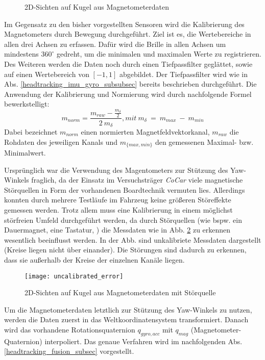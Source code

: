 \begin{figure}[ht]
\centering
{}

\caption[]{2D-Sichten auf Kugel aus Magnetometerdaten}
\label{fig:mag_kugel_plots}
\end{figure}

Im Gegensatz zu den bisher vorgestellten Sensoren wird die Kalibrierung des Magnetometers durch Bewegung durchgeführt.
Ziel ist es, die Wertebereiche in allen drei Achsen zu erfassen.
Dafür wird die Brille in allen Achsen um mindestens $360^\circ$ gedreht, um die minimalen und maximalen Werte zu registrieren. 
Des Weiteren werden die Daten noch durch einen Tiefpassfilter geglättet, sowie auf einen Wertebereich von $[-1,1]$ abgebildet.
Der Tiefpassfilter wird wie in Abs. \ref{headtracking_imu_gyro_subsubsec} bereits beschrieben durchgeführt. 
Die Anwendung der Kalibrierung und Normierung wird durch nachfolgende Formel bewerkstelligt:
\begin{equation}
    m_{norm} = \frac{m_{raw}- \frac{m_{\delta}}{2}}{2~m_{\delta}}, {\scriptstyle mit~m_{\delta}~=~m_{max}~-~m_{min}}
\end{equation}
Dabei bezeichnet $m_{norm}$ einen normierten Magnetfeldvektorkanal, $m_{raw}$ die Rohdaten des jeweiligen Kanals und $m_{\lbrace max, min\rbrace}$ den gemessenen Maximal- bzw. Minimalwert.

Ursprünglich war die Verwendung des Magentometers zur Stützung des Yaw-Winkels fraglich, da der Einsatz im Versuchsträger \emph{CoCar} viele magnetische Störquellen in Form der vorhandenen Boardtechnik vermuten lies. 
Allerdings konnten durch mehrere Testläufe im Fahrzeug keine größeren Störeffekte gemessen werden. Trotz allem muss eine Kalibrierung in einem möglichst störfreien Umfeld durchgeführt werden, da durch Störquellen (wie bspw. ein Dauermagnet, eine Tastatur, \oae) die Messdaten wie in Abb. \ref{fig:uncalibrated_error} zu erkennen wesentlich beeinflusst werden. In der Abb. sind unkalibriete Messdaten dargestellt (Kreise liegen nicht über einander). Die Störungen sind dadurch zu erkennen, dass sie außerhalb der Kreise der einzelnen Kanäle liegen.

\begin{figure}[ht]
	\centering
    \texttt{[image: uncalibrated\_error]}
	\caption[]{2D-Sichten auf Kugel aus Magnetometerdaten mit Störquelle}
	\label{fig:uncalibrated_error}
\end{figure}

Um die Magnetometerdaten letztlich zur Stützung des Yaw-Winkels zu nutzen, werden die Daten zuerst in das Weltkoordinatensystem transformiert.
Danach wird das vorhandene Rotationsquaternion $q_{gyro,acc}$ mit $q_{mag}$ (Magnetometer-Quaternion) interpoliert.
Das genaue Verfahren wird im nachfolgenden Abs. \ref{headtracking_fusion_subsec} vorgestellt.
